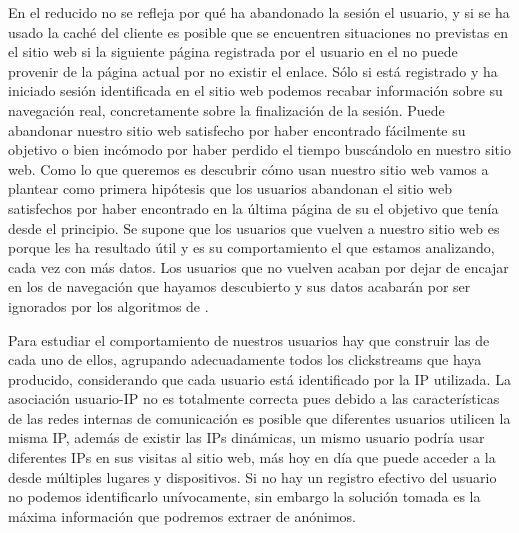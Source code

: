 En el \flog reducido no se refleja por qué ha abandonado la sesión el usuario, y si se ha usado la caché del cliente es posible que se encuentren situaciones no previstas en el sitio web si la siguiente página registrada por el usuario en el \flog no puede provenir de la página actual por no existir el enlace. Sólo si está registrado y ha iniciado sesión identificada en el sitio web podemos recabar información sobre su navegación real, concretamente sobre la finalización de la sesión. Puede abandonar nuestro sitio web satisfecho por haber encontrado fácilmente su objetivo o bien incómodo por haber perdido el tiempo buscándolo en nuestro sitio web. Como lo que queremos es descubrir cómo usan nuestro sitio web vamos a plantear como primera hipótesis que los usuarios abandonan el sitio web satisfechos por haber encontrado en la última página de su \sn el objetivo que tenía desde el principio. Se supone que los usuarios que vuelven a nuestro sitio web es porque les ha resultado útil y es su comportamiento el que estamos analizando, cada vez con más datos. Los usuarios que no vuelven acaban por dejar de encajar en los \patrones de navegación que hayamos descubierto y sus datos acabarán por ser ignorados por los algoritmos de \DM.


Para estudiar el comportamiento de nuestros usuarios hay que construir las \sns de cada uno de ellos, agrupando adecuadamente todos los clickstreams que haya producido, considerando que cada usuario está identificado por la IP utilizada. La asociación usuario-IP no es totalmente correcta pues debido a las características de las redes internas de comunicación es posible que diferentes usuarios utilicen la misma IP, además de existir las IPs dinámicas, un mismo usuario podría usar diferentes IPs en sus visitas al sitio web, más hoy en día que puede acceder a la \WWW desde múltiples lugares y dispositivos. Si no hay un registro efectivo del usuario no podemos identificarlo unívocamente, sin embargo la solución tomada es la máxima información que podremos extraer de \flogs anónimos.

